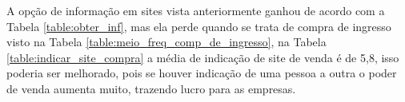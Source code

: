 \documentclass[12pt]{article}
\begin{document}
        \begin{table}[h!]
            \centering
            \caption{De 1 a 10 qual a possibilidade do entrevistado indicar o último site de compra de ingresso de cinema}
            \label{table:indicar_site_compra}
        \end{table}
        \FloatBarrier
    
        A opção de informação em sites vista anteriormente ganhou de acordo com a Tabela \ref{table:obter_inf}, mas ela perde quando se trata de compra de ingresso visto na Tabela \ref{table:meio_freq_comp_de_ingresso}, na Tabela \ref{table:indicar_site_compra} a média de indicação de site de venda é de 5,8, isso poderia ser melhorado, pois se houver indicação de uma pessoa a outra o poder de venda aumenta muito, trazendo lucro para as empresas.
   
\end{document}
